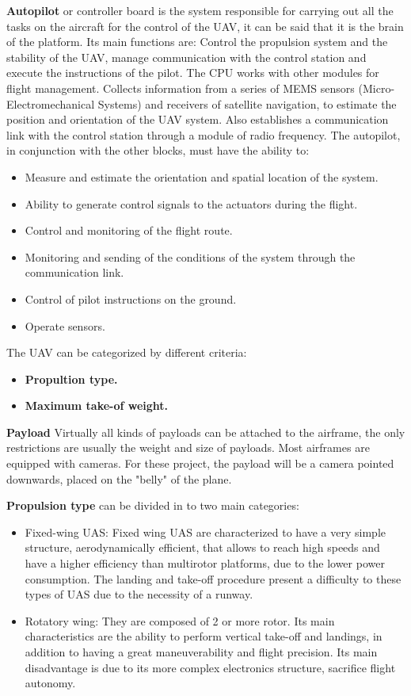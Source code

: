 \textbf{ Autopilot} or controller board is the system responsible for carrying out all the tasks on the aircraft for the control of the UAV, it can be said that it is the brain of the platform. Its main functions are: Control the propulsion system and the stability of the UAV, manage communication with the control station and execute the instructions of the pilot. The CPU works with other modules for flight management. Collects information from a series of MEMS sensors (Micro-Electromechanical Systems) and receivers of satellite navigation, to estimate the position and orientation of the UAV system. Also
establishes a communication link with the control station through a module of radio frequency.\cite{Edgar}
The autopilot, in conjunction with the other blocks, must have the ability to:
\begin{itemize}
    \item Measure and estimate the orientation and spatial location of the system.
    \item Ability to generate control signals to the actuators during the flight.
    \item Control and monitoring of the flight route.
    \item Monitoring and sending of the conditions of the system through the communication link.
    \item Control of pilot instructions on the ground.
    \item Operate sensors.
\end{itemize}
The UAV can be categorized by different criteria: 
\begin{itemize}
    \item \textbf{Propultion type.}
    \item  \textbf{Maximum take-of weight.}
\end{itemize}
\textbf{Payload} Virtually all kinds of payloads can be attached to the airframe, the only restrictions are usually the weight and size of payloads. Most airframes are equipped with cameras. For these project, the payload will be a camera pointed downwards, placed on the "belly" of the plane. 

\textbf{Propulsion type} can be divided in to two main categories:
\begin{itemize}
\item Fixed-wing UAS: Fixed wing UAS are characterized to have a very simple structure, aerodynamically efficient, that allows to reach high speeds and have a higher efficiency than multirotor platforms, due to the lower power consumption. The landing and take-off procedure present a difficulty to these types of UAS due to the necessity of a runway.
\item Rotatory wing: They are composed of 2 or more rotor. Its main characteristics are the ability to perform vertical take-off and landings, in addition to having a great maneuverability and flight precision. Its main disadvantage is due to its more complex electronics structure, sacrifice flight autonomy.\cite{Luis_Fernadno}
\end{itemize}

